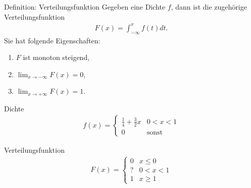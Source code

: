 \documentclass[t,11pt]{beamer}
\begin{document}
\begin{frame}
	\begin{alertblock}{Definition: Verteilungsfunktion}
		Gegeben eine Dichte $f$, dann ist die zugehörige Verteilungsfunktion 
		\begin{align*}
			F(x) = \int_{-\infty}^{x} f(t)dt.
		\end{align*}
	Sie hat folgende Eigenschaften:
	\begin{enumerate}
		\item $F$ ist monoton steigend,
		\item $\lim_{x\to -\infty} F(x)=0$,
		\item $\lim_{x\to +\infty} F(x)=1$.
	\end{enumerate}
\end{alertblock}
\end{frame}

\begin{frame}
\begin{block}{Dichte}
	\vspace{-0.5cm}
	\begin{align*}
	f(x)=\begin{cases}
	\frac{1}{4}+\frac{3}{2} x & 0<x<1\\
	0 & \text{sonst}
	\end{cases}
	\end{align*}
\end{block}

\begin{block}{Verteilungsfunktion}
	\vspace{-0.5cm}
	\begin{align*}
	F(x)=\begin{cases}
	0 & x\leq 0 \\
	?  & 0<x<1\\
	1 & x \geq 1
	\end{cases}
	\end{align*}
\end{block}
\end{frame}
\end{document}
